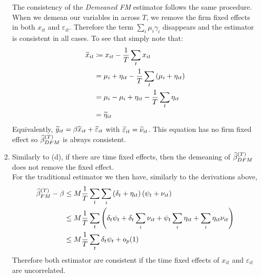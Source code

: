 \begin{solution}
\begin{enumerate}[label = (\alph*)]
    The consistency of the \textit{Demeaned FM} estimator follows the same procedure. When we demean our variables in across \(T\), we remove the firm fixed effects in both \(x_{it}\) and \(\varepsilon_{it}\). Therefore the term \(\sum_i \mu_i\gamma_i\) disappears and the estimator is consistent in all cases. To see that simply note that:
    \begin{align*}
        \widetilde{x}_{it} & \coloneqq x_{it} - \frac{1}{T}\sum_t x_{it} \\
        & = \mu_i + \eta_{it} - \frac{1}{T}\sum_t \left( \mu_i + \eta_{it} \right) \\
        & = \mu_i - \mu_i + \eta_{it} - \frac{1}{T}\sum_t\eta_{it} \\
        & = \widetilde{\eta}_{it}
    \end{align*}
    Equivalently, \(\widetilde{y}_{it} = \beta\widetilde{x}_{it} + \widetilde{\varepsilon}_{it}\) with \(\widetilde{\varepsilon}_{it} = \widetilde{\nu}_{it}\). This equation has no firm fixed effect so \(\widehat{\beta}^{(T)}_{DFM}\) is always consistent. 
    
    \item Similarly to (d), if there are time fixed effects, then the demeaning of \(\widehat{\beta}^{(T)}_{DFM}\) does not remove the fixed effect. \\
    For the traditional estimator we then have, similarly to the derivations above,
    \begin{align*}
        \widehat{\beta}^{(T)}_{FM} - \beta & \leq M \frac{1}{T}\sum_t\sum_i \left( \delta_t+\eta_{it} \right)\left( \psi_t+\nu_{it} \right) \\
        & \leq M\frac{1}{T}\sum_t\left( \delta_t\psi_t + \delta_t\sum_i\nu_{it} + \psi_t\sum_i\eta_{it} + \sum_i\eta_{it}\nu_{it} \right) \\
        & \leq M\frac{1}{T}\sum_t \delta_t\psi_t + o_p(1)
    \end{align*}
    Therefore both estimator are consistent if the time fixed effects of \(x_{it}\) and \(\varepsilon_{it}\) are uncorrelated.


\end{enumerate}
\end{solution}

